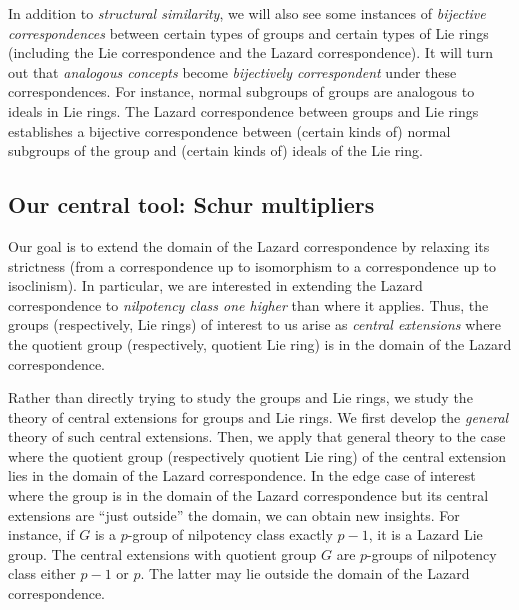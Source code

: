 \documentclass{ucetd}
\begin{document}
In addition to {\em structural similarity}, we will also see some
instances of {\em bijective correspondences} between certain types of
groups and certain types of Lie rings (including the Lie
correspondence and the Lazard correspondence). It will turn out that
{\em analogous concepts} become {\em bijectively correspondent} under
these correspondences. For instance, normal subgroups of groups are
analogous to ideals in Lie rings. The Lazard correspondence between
groups and Lie rings establishes a bijective correspondence between
(certain kinds of) normal subgroups of the group and (certain kinds
of) ideals of the Lie ring.

\subsection{Our central tool: Schur multipliers}

Our goal is to extend the domain of the Lazard correspondence by
relaxing its strictness (from a correspondence up to isomorphism to a
correspondence up to isoclinism). In particular, we are interested in
extending the Lazard correspondence to {\em nilpotency class one
  higher} than where it applies. Thus, the groups
(respectively, Lie rings) of interest to us arise as {\em central
  extensions} where the quotient group (respectively, quotient Lie
ring) is in the domain of the Lazard correspondence.

Rather than directly trying to study the groups and Lie rings, we
study the theory of central extensions for groups and Lie rings. We
first develop the {\em general} theory of such central
extensions. Then, we apply that general theory to the case where the
quotient group (respectively quotient Lie ring) of the central
extension lies in the domain of the Lazard correspondence. In the edge
case of interest where the group is in the domain of the Lazard
correspondence but its central extensions are ``just outside'' the
domain, we can obtain new insights. For instance, if $G$ is a
$p$-group of nilpotency class exactly $p - 1$, it is a Lazard Lie
group. The central extensions with quotient group $G$ are $p$-groups
of nilpotency class either $p - 1$ or $p$. The latter may lie outside
the domain of the Lazard correspondence.
\end{document}
